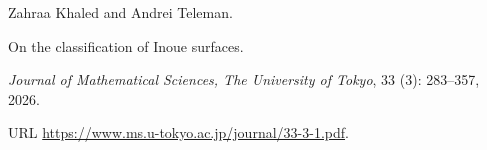 Zahraa Khaled and Andrei Teleman.

\newblock On the classification of {Inoue} surfaces.

\newblock \emph{Journal of Mathematical Sciences, The University of Tokyo},
  33 (3): 283--357, 2026{}.

\newblock URL \url{https://www.ms.u-tokyo.ac.jp/journal/33-3-1.pdf}.


